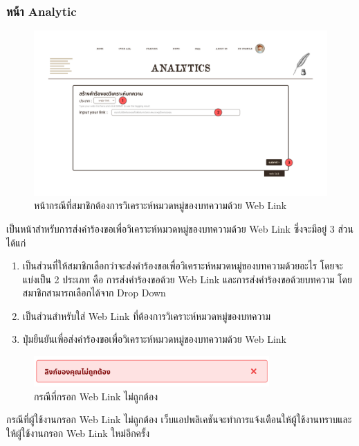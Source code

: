\documentclass[12pt,oneside,openright,a4paper]{cpe-thai-project}
\begin{document}
\subsubsection{หน้า Analytic}
\begin{figure}[!ht]\centering
  \includegraphics[width=16cm]{./img/project_ui/weblink_1.png} 
  \caption{หน้ากรณีที่สมาชิกต้องการวิเคราะห์หมวดหมู่ของบทความด้วย Web Link}\label{fig:ana_weblink} 
\end{figure}
\hspace*{1cm}เป็นหน้าสำหรับการส่งคำร้องขอเพื่อวิเคราะห์หมวดหมู่ของบทความด้วย Web Link ซึ่งจะมีอยู่ 3 ส่วน ได้แก่
\begin{enumerate}
  \item เป็นส่วนที่ให้สมาชิกเลือกว่าจะส่งคำร้องขอเพื่อวิเคราะห์หมวดหมู่ของบทความด้วยอะไร โดยจะแบ่งเป็น 2 ประเภท คือ 
        การส่งคำร้องขอด้วย Web Link และการส่งคำร้องขอด้วยบทความ โดยสมาชิกสามารถเลือกได้จาก Drop Down
  \item เป็นส่วนสำหรับใส่ Web Link ที่ต้องการวิเคราะห์หมวดหมู่ของบทความ
  \item ปุ่มยืนยันเพื่อส่งคำร้องขอเพื่อวิเคราะห์หมวดหมู่ของบทความด้วย Web Link
\end{enumerate}
\begin{figure}[!ht]\centering
  \includegraphics[width=9cm]{./img/project_ui/linkfail.png} 
  \caption{กรณีที่กรอก Web Link ไม่ถูกต้อง}\label{fig:linkfail} 
\end{figure}
\hspace*{1cm}กรณีที่ผู้ใช้งานกรอก Web Link ไม่ถูกต้อง เว็บแอปพลิเคชันจะทำการแจ้งเตือนให้ผู้ใช้งานทราบและให้ผู้ใช้งานกรอก Web Link ใหม่อีกครั้ง \newpage
\end{document}
